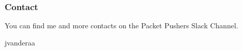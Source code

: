 \documentclass{beamer}
\begin{document}
\begin{frame}
  \frametitle{Contact}
  \huge
  You can find me and more contacts on the Packet Pushers Slack Channel. 
  \linebreak
  \begin{center}
    \normalsize
    \faSlack \hspace{.1cm}jvanderaa  
  \end{center}
  
\end{frame}
\end{document}
